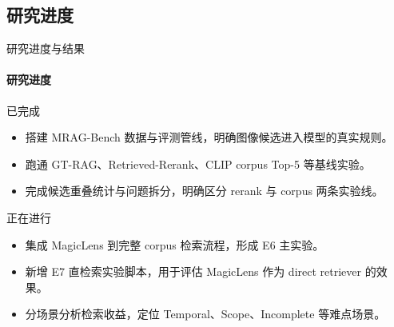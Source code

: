 \documentclass[10pt,aspectratio=169,]{beamer}
\begin{document}
\subsection{研究进度}
\begin{frame}{研究进度与结果}
	\framesubtitle{研究进度}
	\begin{block}{已完成}
		\begin{itemize}
			\item 搭建 MRAG-Bench 数据与评测管线，明确图像候选进入模型的真实规则。
			\item 跑通 GT-RAG、Retrieved-Rerank、CLIP corpus Top-5 等基线实验。
			\item 完成候选重叠统计与问题拆分，明确区分 rerank 与 corpus 两条实验线。
		\end{itemize}
	\end{block}
	\begin{alertblock}{正在进行}
		\begin{itemize}
			\item 集成 MagicLens 到完整 corpus 检索流程，形成 E6 主实验。
			\item 新增 E7 直检索实验脚本，用于评估 MagicLens 作为 direct retriever 的效果。
			\item 分场景分析检索收益，定位 Temporal、Scope、Incomplete 等难点场景。
		\end{itemize}
	\end{alertblock}
\end{frame}
\end{document}
